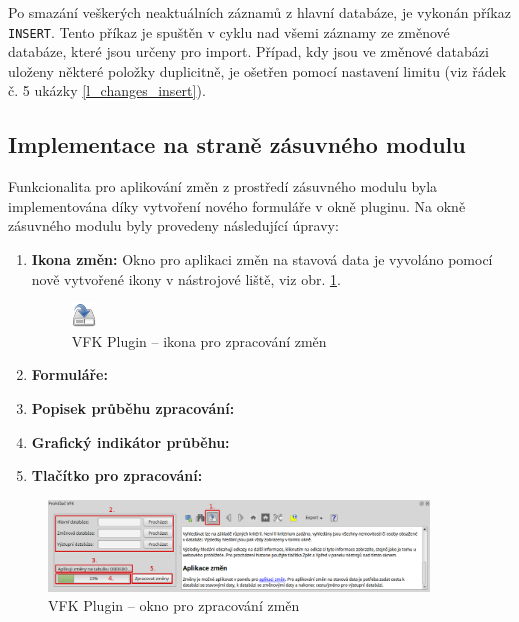 \documentclass[a4paper,12pt,oneside]{book}
\begin{document}
Po smazání veškerých neaktuálních záznamů z hlavní databáze, je vykonán příkaz \texttt{INSERT}. Tento příkaz je spuštěn v cyklu nad všemi záznamy ze změnové databáze, které jsou určeny pro import. Případ, kdy jsou ve změnové databázi uloženy některé položky duplicitně, je ošetřen pomocí nastavení limitu (viz řádek č. 5 ukázky \ref{l_changes_insert}).




\subsection{Implementace na straně zásuvného modulu}
\label{l_implementace_zmen}
Funkcionalita pro aplikování změn z prostředí zásuvného modulu byla implementována díky vytvoření nového formuláře v okně pluginu. Na okně zásuvného modulu byly provedeny následující úpravy:

\begin{enumerate}
 \item \textbf{Ikona změn:} Okno pro aplikaci změn na stavová data je vyvoláno pomocí nově vytvořené ikony v nástrojové liště, viz obr. \ref{l_ikona_zmen}.

\begin{figure}[htb]
\centering
\includegraphics[scale=0.9]{images/applyChanges.png}
\caption[VFK Plugin -- ikona pro zpracování změn]{VFK Plugin -- ikona pro zpracování změn}
\label{l_ikona_zmen}
\end{figure} 
 
 \item \textbf{Formuláře:} 
 \item \textbf{Popisek průběhu zpracování:} 
 \item \textbf{Grafický indikátor průběhu:} 
 \item \textbf{Tlačítko pro zpracování:} 
\end{enumerate}





\begin{figure}[htb]
\centering
\includegraphics[width=0.9\textwidth]{images/vfkPlugin-zmeny.png}
\caption[VFK Plugin -- okno pro zpracování změn]{VFK Plugin -- okno pro zpracování změn}
\label{l_plugin_zmeny}
\end{figure}
\end{document}

